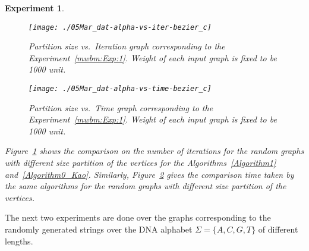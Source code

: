 \documentclass[runningheads,a4paper]{llncs}
\newtheorem{experiment}{Experiment}
\begin{document}
\begin{experiment}
\begin{figure}[!htpb]\centering
\texttt{[image: ./05Mar\_dat-alpha-vs-iter-bezier\_c]}
\caption{Partition size vs.\ Iteration graph corresponding to the Experiment~\ref{mwbm:Exp:1}. Weight of each input graph is fixed to be 1000 unit.}
\label{mwbm:Fig:Exp1:Iteration}
\end{figure}
\begin{figure}[!htpb]\centering
\texttt{[image: ./05Mar\_dat-alpha-vs-time-bezier\_c]}\caption{Partition size vs.\ Time graph corresponding to the Experiment~\ref{mwbm:Exp:1}. Weight of each input graph is fixed to be 1000 unit.}
\label{mwbm:Fig:Exp1:Time}
\end{figure}


Figure~\ref{mwbm:Fig:Exp1:Iteration} shows the comparison on the number of iterations for the random graphs with different size partition of the vertices for the Algorithms~\ref{Algorithm1} and~\ref{Algorithm0_Kao}. Similarly, Figure~\ref{mwbm:Fig:Exp1:Time} gives the comparison time taken by the same algorithms for the random graphs with different size partition of the vertices. 
\end{experiment}
\newpage
The next two experiments are done over the  graphs corresponding to the randomly generated 
strings over the DNA alphabet $\varSigma=\{A,C,G,T\}$ of different lengths.
\end{document}
